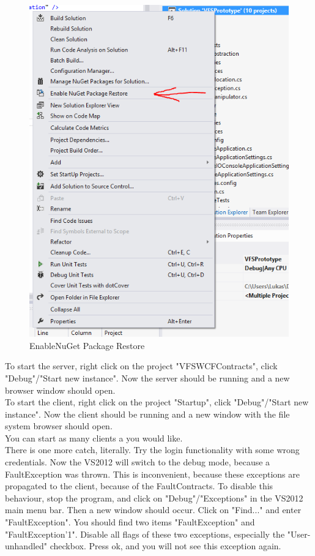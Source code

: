 \documentclass[JCDReport.tex]{subfiles}
\begin{document}
\begin{figure}[h!]
	\centering
	\includegraphics[scale=1]{Images/nuget_restore.png} 
	\caption{EnableNuGet Package Restore}
	\label{fig:nugetPackageRestore}
\end{figure}	

To start the server, right click on the project "VFSWCFContracts", click "Debug"/"Start new instance". Now the server should be running and a new browser window should open.\\

To start the client, right click on the project "Startup", click "Debug"/"Start new instance". Now the client should be running and a new window with the file system browser should open.\\

You can start as many clients a you would like.\\

There is one more catch, literally. Try the login functionality with some wrong credentials. Now the VS2012 will switch to the debug mode, because a FaultException was thrown. This is inconvenient, because these exceptions are propagated to the client, because of the FaultContracts. To disable this behaviour, stop the program, and click on "Debug"/"Exceptions" in the VS2012 main menu bar. Then a new window should occur. Click on "Find..." and enter "FaultException". You should find two items "FaultException" and "FaultException'1". Disable all flags of these two exceptions, especially the "User-unhandled" checkbox. Press ok, and you will not see this exception again.
\end{document}
